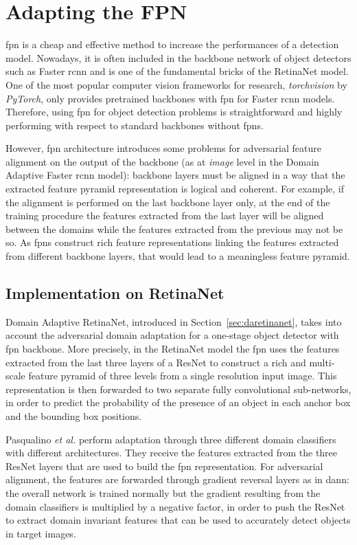\documentclass[%
    corpo=12pt,
    twoside,
    stile=classica,   
    tipotesi=magistrale,
    evenboxes,
    english
]{toptesi}
\begin{document}
\section{Adapting the FPN}
\acrfull{fpn} is a cheap and effective method to increase the performances of a detection model. Nowadays, it is often included in the backbone network of object detectors such as Faster \gls{rcnn} and is one of the fundamental bricks of the RetinaNet model. One of the most popular computer vision frameworks for research, \textit{torchvision} by \textit{PyTorch}\cite{paszke2019pytorch}, only provides pretrained backbones with \gls{fpn} for Faster \gls{rcnn} models. Therefore, using \gls{fpn} for object detection problems is straightforward and highly performing with respect to standard backbones without \glspl{fpn}.

However, \gls{fpn} architecture introduces some problems for adversarial feature alignment on the output of the backbone (as at \textit{image} level in the Domain Adaptive Faster \gls{rcnn} model): backbone layers must be aligned in a way that the extracted feature pyramid representation is logical and coherent. For example, if the alignment is performed on the last backbone layer only, at the end of the training procedure the features extracted from the last layer will be aligned between the domains while the features extracted from the previous may not be so. As \glspl{fpn} construct rich feature representations linking the features extracted from different backbone layers, that would lead to a meaningless feature pyramid. 

\subsection{Implementation on RetinaNet}
Domain Adaptive RetinaNet, introduced in Section~\ref{sec:daretinanet}, takes into account the adversarial domain adaptation for a one-stage object detector with \gls{fpn} backbone. More precisely, in the RetinaNet model the \gls{fpn} uses the features extracted from the last three layers of a ResNet to construct a rich and multi-scale feature pyramid of three levels from a single resolution input image. This representation is then forwarded to two separate fully convolutional sub-networks, in order to predict the probability of the presence of an object in each anchor box and the bounding box positions.

Pasqualino \textit{et al.} perform adaptation through three different domain classifiers with different architectures. They receive the features extracted from the three ResNet layers that are used to build the \gls{fpn} representation. For adversarial alignment, the features are forwarded through gradient reversal layers as in \gls{dann}: the overall network is trained normally but the gradient resulting from the domain classifiers is multiplied by a negative factor, in order to push the ResNet to extract domain invariant features that can be used to accurately detect objects in target images.
\end{document}
